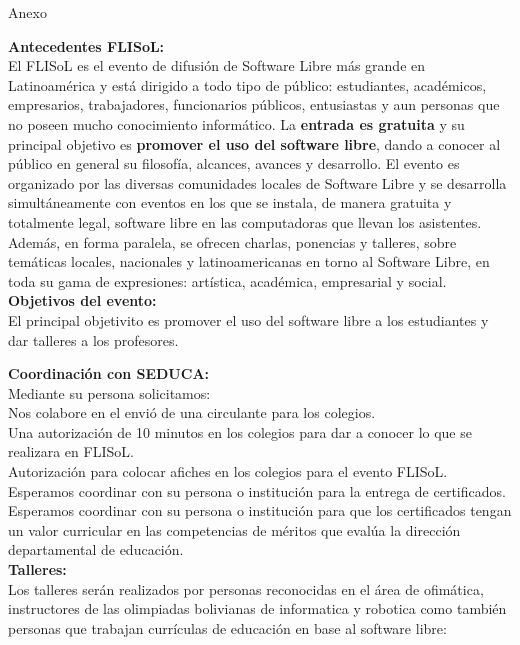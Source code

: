 \documentclass[xcolor, x11names, letterpaper, 12pt]{letter}
\begin{document}
\begin{center}
{\Huge Anexo}
\end{center}

\textbf{Antecedentes FLISoL:}\\
El FLISoL es el evento de difusión de Software Libre más grande en Latinoamérica y está dirigido a todo tipo de público: estudiantes, académicos, empresarios, trabajadores, funcionarios públicos, entusiastas y aun personas que no poseen mucho conocimiento informático. La \textbf{entrada es gratuita} y su principal objetivo es \textbf{promover el uso del software libre}, dando a conocer al público en general su filosofía, alcances, avances y desarrollo.
El evento es organizado por las diversas comunidades locales de Software Libre y se desarrolla simultáneamente con eventos en los que se instala, de manera gratuita y totalmente legal, software libre en las computadoras que llevan los asistentes. Además, en forma paralela, se ofrecen charlas, ponencias y talleres, sobre temáticas locales, nacionales y latinoamericanas en torno al Software Libre, en toda su gama de expresiones: artística, académica, empresarial y social.
\\
\textbf{Objetivos del evento:}\\
El principal objetivito es promover el uso del software libre a los estudiantes y dar talleres a los profesores.

\textbf{Coordinación con SEDUCA:}\\
Mediante su persona solicitamos:\\
Nos colabore en el envió de una circulante para los colegios.\\
Una autorización de 10 minutos en los colegios para dar a conocer lo que se realizara en FLISoL.\\
Autorización para colocar afiches en los colegios para el evento FLISoL.\\
Esperamos coordinar con su persona o institución para la entrega de certificados.\\
Esperamos coordinar con su persona o institución para que los certificados tengan un valor curricular en las competencias de méritos que evalúa la dirección departamental de educación.\\


\textbf{Talleres:}\\
Los talleres serán realizados por personas reconocidas en el área de ofimática, instructores de las olimpiadas bolivianas de informatica y robotica como también personas que  trabajan  currículas de educación en base al software libre:\\
\end{document}
